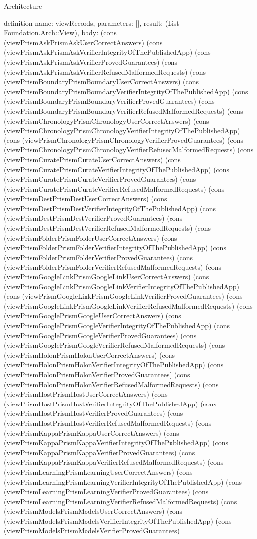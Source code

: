 \begin{lexlean}{Architecture}
\begin{semanticmodule}
definition{
  name: viewRecords,
  parameters: [],
  result: (List Foundation.Arch::View),
  body: (cons (viewPrismAskPrismAskUserCorrectAnswers) (cons (viewPrismAskPrismAskVerifierIntegrityOfThePublishedApp) (cons (viewPrismAskPrismAskVerifierProvedGuarantees) (cons (viewPrismAskPrismAskVerifierRefusedMalformedRequests) (cons (viewPrismBoundaryPrismBoundaryUserCorrectAnswers) (cons (viewPrismBoundaryPrismBoundaryVerifierIntegrityOfThePublishedApp) (cons (viewPrismBoundaryPrismBoundaryVerifierProvedGuarantees) (cons (viewPrismBoundaryPrismBoundaryVerifierRefusedMalformedRequests) (cons (viewPrismChronologyPrismChronologyUserCorrectAnswers) (cons (viewPrismChronologyPrismChronologyVerifierIntegrityOfThePublishedApp) (cons (viewPrismChronologyPrismChronologyVerifierProvedGuarantees) (cons (viewPrismChronologyPrismChronologyVerifierRefusedMalformedRequests) (cons (viewPrismCuratePrismCurateUserCorrectAnswers) (cons (viewPrismCuratePrismCurateVerifierIntegrityOfThePublishedApp) (cons (viewPrismCuratePrismCurateVerifierProvedGuarantees) (cons (viewPrismCuratePrismCurateVerifierRefusedMalformedRequests) (cons (viewPrismDestPrismDestUserCorrectAnswers) (cons (viewPrismDestPrismDestVerifierIntegrityOfThePublishedApp) (cons (viewPrismDestPrismDestVerifierProvedGuarantees) (cons (viewPrismDestPrismDestVerifierRefusedMalformedRequests) (cons (viewPrismFolderPrismFolderUserCorrectAnswers) (cons (viewPrismFolderPrismFolderVerifierIntegrityOfThePublishedApp) (cons (viewPrismFolderPrismFolderVerifierProvedGuarantees) (cons (viewPrismFolderPrismFolderVerifierRefusedMalformedRequests) (cons (viewPrismGoogleLinkPrismGoogleLinkUserCorrectAnswers) (cons (viewPrismGoogleLinkPrismGoogleLinkVerifierIntegrityOfThePublishedApp) (cons (viewPrismGoogleLinkPrismGoogleLinkVerifierProvedGuarantees) (cons (viewPrismGoogleLinkPrismGoogleLinkVerifierRefusedMalformedRequests) (cons (viewPrismGooglePrismGoogleUserCorrectAnswers) (cons (viewPrismGooglePrismGoogleVerifierIntegrityOfThePublishedApp) (cons (viewPrismGooglePrismGoogleVerifierProvedGuarantees) (cons (viewPrismGooglePrismGoogleVerifierRefusedMalformedRequests) (cons (viewPrismHolonPrismHolonUserCorrectAnswers) (cons (viewPrismHolonPrismHolonVerifierIntegrityOfThePublishedApp) (cons (viewPrismHolonPrismHolonVerifierProvedGuarantees) (cons (viewPrismHolonPrismHolonVerifierRefusedMalformedRequests) (cons (viewPrismHostPrismHostUserCorrectAnswers) (cons (viewPrismHostPrismHostVerifierIntegrityOfThePublishedApp) (cons (viewPrismHostPrismHostVerifierProvedGuarantees) (cons (viewPrismHostPrismHostVerifierRefusedMalformedRequests) (cons (viewPrismKappaPrismKappaUserCorrectAnswers) (cons (viewPrismKappaPrismKappaVerifierIntegrityOfThePublishedApp) (cons (viewPrismKappaPrismKappaVerifierProvedGuarantees) (cons (viewPrismKappaPrismKappaVerifierRefusedMalformedRequests) (cons (viewPrismLearningPrismLearningUserCorrectAnswers) (cons (viewPrismLearningPrismLearningVerifierIntegrityOfThePublishedApp) (cons (viewPrismLearningPrismLearningVerifierProvedGuarantees) (cons (viewPrismLearningPrismLearningVerifierRefusedMalformedRequests) (cons (viewPrismModelsPrismModelsUserCorrectAnswers) (cons (viewPrismModelsPrismModelsVerifierIntegrityOfThePublishedApp) (cons (viewPrismModelsPrismModelsVerifierProvedGuarantees) }
\end{semanticmodule}
\end{lexlean}
